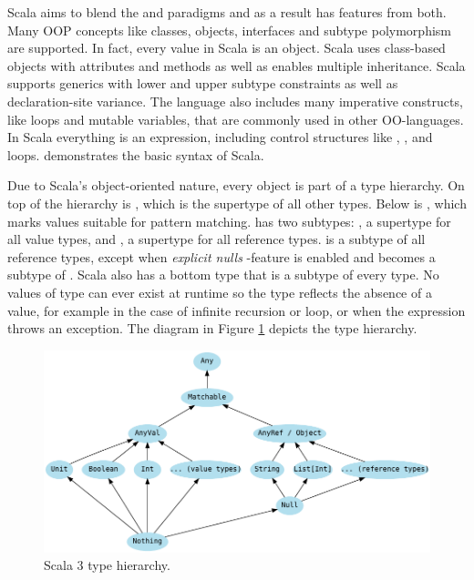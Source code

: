 Scala aims to blend the  and  paradigms and as a result has features from both. Many OOP concepts like classes, objects, interfaces and subtype polymorphism are supported. In fact, every value in Scala is an object. Scala uses class-based objects with attributes and methods as well as enables multiple inheritance. Scala supports generics with lower and upper subtype constraints as well as declaration-site variance. The language also includes many imperative constructs, like loops and mutable variables, that are commonly used in other OO-languages. In Scala everything is an expression, including control structures like , , and loops.  demonstrates the basic syntax of Scala.




Due to Scala's object-oriented nature, every object is part of a type hierarchy. On top of the hierarchy is , which is the supertype of all other types. Below  is , which marks values suitable for pattern matching.  has two subtypes: , a supertype for all value types, and , a supertype for all reference types.  is a subtype of all reference types, except when \textit{explicit nulls} -feature is enabled and  becomes a subtype of . Scala also has a bottom type  that is a subtype of every type. No values of type  can ever exist at runtime so the type reflects the absence of a value, for example in the case of infinite recursion or loop, or when the expression throws an exception. The diagram in Figure \ref{fig:scala-type-hierarchy} depicts the type hierarchy.

\begin{figure}
    \centering
    \includegraphics{images/type-hierarchy}
    \caption{Scala 3 type hierarchy.}
    \label{fig:scala-type-hierarchy}
\end{figure}

